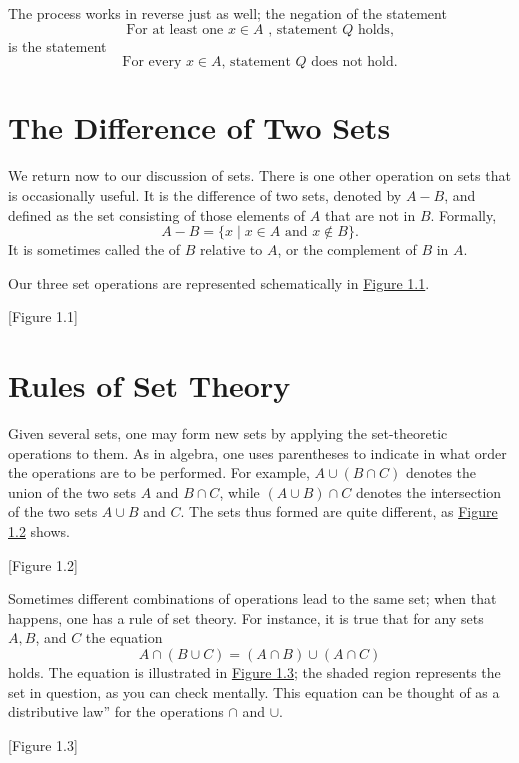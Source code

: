 The process works in reverse just as well; the negation of the statement
\[
\text{ For at least one }x \in A\text{ , statement }Q\text{ holds, }
\]
is the statement
\[
\text{For every } x \in A \text{, statement } Q \text{ does not hold.}
\]

\section*{The Difference of Two Sets}

We return now to our discussion of sets. There is one other operation on sets that is 
occasionally useful. It is the difference of two sets, denoted by \(A - B\), and defined as 
the set consisting of those elements of \(A\) that are not in \(B\). Formally,
\[
A - B = \{ x \mid x \in A\text{ and }x \notin B\}.
\]
It is sometimes called the  of \(B\) relative to \(A\), or the complement of \(B\) in \(A\). 

Our three set operations are represented schematically in \hyperref[fig:1.1]{Figure 1.1}.

[Figure 1.1]

\section*{Rules of Set Theory}

Given several sets, one may form new sets by applying the set-theoretic operations to them. 
As in algebra, one uses parentheses to indicate in what order the operations are to be performed. 
For example, \(A \cup ({B \cap C})\) denotes the union of the two sets \(A\) and \(B \cap C\), 
while \(({A \cup B}) \cap C\) denotes the intersection of the two sets \(A \cup B\) and \(C\). 
The sets thus formed are quite different, as \hyperref[fig:1.2]{Figure 1.2} shows.

[Figure 1.2]

Sometimes different combinations of operations lead to the same set; when that happens, 
one has a rule of set theory. For instance, it is true that for any sets \(A,B\), and \(C\) the equation
\[
A \cap ({B \cup C}) = ({A \cap B}) \cup ({A \cap C})
\]
holds. The equation is illustrated in \hyperref[fig:1.3]{Figure 1.3}; the shaded region represents the set in question, 
as you can check mentally. This equation can be thought of as a distributive law'' 
for the operations \(\cap\) and \(\cup\).

[Figure 1.3]

